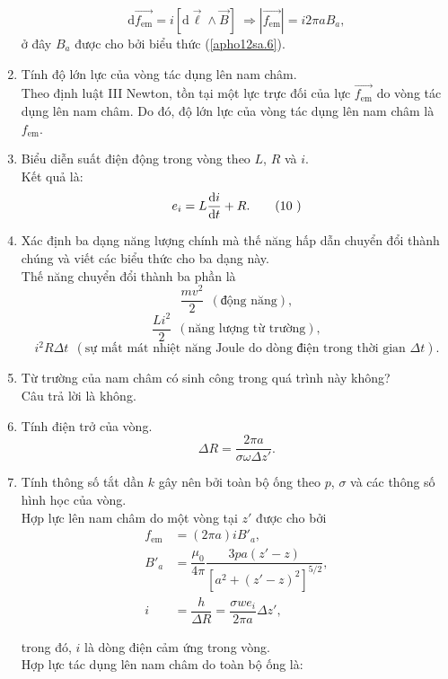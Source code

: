 \begin{loigiai}
\begin{enumerate}[1)]
    \[\mathrm{d}\overrightarrow{f_{\text{em}}}=i\left[\mathrm{d}\overrightarrow{\ell}\wedge\overrightarrow{B}\right]~\Rightarrow \left|\overrightarrow{f_{\text{em}}}\right|=i2\pi aB_{a}, \tag{9} \label{apho12sa.9}\]
    ở đây $B_{a}$ được cho bởi biểu thức (\ref{apho12sa.6}).
    \item Tính độ lớn lực của vòng tác dụng lên nam châm.\\
    Theo định luật III Newton, tồn tại một lực trực đối của lực $\overrightarrow{f_{\text{em}}}$ do vòng tác dụng lên nam châm. Do đó, độ lớn lực của vòng tác dụng lên nam châm là $f_{\text{em}}$.
    \item Biểu diễn suất điện động trong vòng theo $L$, $R$ và $i$.\\
    Kết quả là:
    \[e_{i}=L\dfrac{\mathrm{d}i}{\mathrm{d}t}+R. \tag{10 \label{apho12sa.10}}\]
    \item Xác định ba dạng năng lượng chính mà thế năng hấp dẫn chuyển đổi thành chúng và viết các biểu thức cho ba dạng này.\\
    Thế năng chuyển đổi thành ba phần là
\[ \dfrac{mv^2}{2}~~(\text{động năng}),\tag{11} \label{apho12sa.11}\]
\[\dfrac{Li^2}{2}~~(\text{năng lượng từ trường}), \tag{12} \label{apho12sa.12}\]
\[i^2R\Delta t~~(\text{sự mất mát nhiệt năng Joule do dòng điện trong thời gian $\Delta t$}). \tag{13} \label{apho12sa.13}\]

    \item Từ trường của nam châm có sinh công trong quá trình này không?\\ Câu trả lời là không.
    \item Tính điện trở của vòng.\\
    \[\Delta R=\dfrac{2\pi a}{\sigma \omega \Delta z'}. \tag{14} \label{apho12sa.14}\]
    \item Tính thông số tắt dần $k$ gây nên bởi toàn bộ ống theo $p$, $\sigma$ và các thông số hình học của vòng.\\
    Hợp lực lên nam châm do một vòng tại $z'$ được cho bởi
    \begin{align*}
        f_{\text{em}}&=(2\pi a)iB'_{a}, \tag{15} \label{apho12sa.15}\\
        B'_{a}&=\dfrac{\mu_0}{4\pi}\dfrac{3pa(z'-z)}{[a^2+(z'-z)^2]^{5/2}}, \tag{16} \label{apho12sa.16}\\
        i&=\dfrac{h}{\Delta R}=\dfrac{\sigma we_{i}}{2\pi a}\Delta z', \tag{17} \label{apho12sa.17}
    \end{align*}
    
    trong đó, $i$ là dòng điện cảm ứng trong vòng.\\
    Hợp lực tác dụng lên nam châm do toàn bộ ống là:
    

\end{enumerate}
\end{loigiai}
